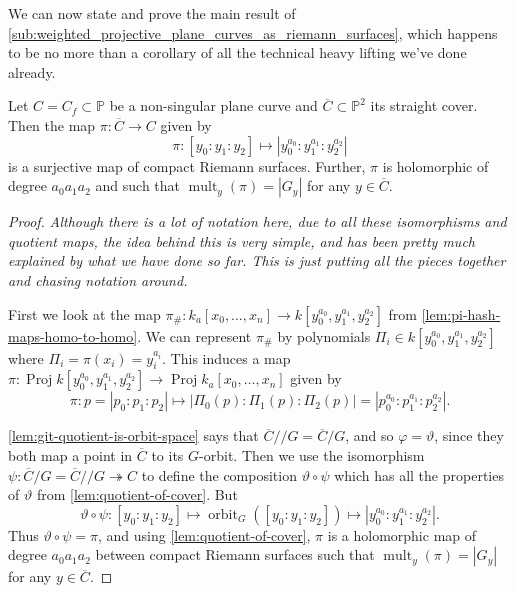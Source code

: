 \documentclass[10pt,notitlepage]{article}
\numberwithin{equation}{subsection}
\DeclareMathOperator{\proj}{Proj}
\DeclareMathOperator{\mult}{mult}
\DeclareMathOperator{\orbit}{orbit}
\newcommand{\pee}{\mathbb{P}}
\newcommand{\cover}[1]{\overline{#1}}
\newcommand{\kazn}{k_a[x_0,\ldots,x_n]}
\newcommand{\sslash}{/\!\!/}
\begin{document}
        We can now state and prove the main result of \cref{sub:weighted_projective_plane_curves_as_riemann_surfaces}, which happens to be no more than a corollary of all the technical heavy lifting we've done already.

        \begin{corollary}\label{cor:quotient-set-up-with-pi-etc}
            Let $C=C_f\subset\pee$ be a non-singular plane curve and $\cover{C}\subset\pee^2$ its straight cover.
            Then the map $\pi\colon\cover{C}\to C$ given by
            \[
                \pi\colon[y_0:y_1:y_2]\mapsto|y_0^{a_0}:y_1^{a_1}:y_2^{a_2}|
            \]
            is a surjective map of compact Riemann surfaces.
            Further, $\pi$ is holomorphic of degree $a_0a_1a_2$ and such that $\mult_y(\pi)=|G_y|$ for any $y\in\cover{C}$.
        \end{corollary}

        \begin{proof}
            \emph{Although there is a lot of notation here, due to all these isomorphisms and quotient maps, the idea behind this is very simple, and has been pretty much explained by what we have done so far.
                        This is just putting all the pieces together and chasing notation around.}

            First we look at the map $\pi_\#\colon\kazn\to k[y_0^{a_0},y_1^{a_1},y_2^{a_2}]$ from \cref{lem:pi-hash-maps-homo-to-homo}.
            We can represent $\pi_\#$ by polynomials $\Pi_i\in k[y_0^{a_0},y_1^{a_1},y_2^{a_2}]$ where $\Pi_i=\pi(x_i)=y_i^{a_i}$.
            This induces a map $\pi\colon\proj k[y_0^{a_0},y_1^{a_1},y_2^{a_2}]\to\proj\kazn$ given by
            \[
                \pi\colon p=|p_0:p_1:p_2|\mapsto|\Pi_0(p):\Pi_1(p):\Pi_2(p)| = |p_0^{a_0}:p_1^{a_1}:p_2^{a_2}|.
            \]

            \cref{lem:git-quotient-is-orbit-space} says that $\cover{C}\sslash G=\cover{C}/G$, and so $\varphi=\vartheta$, since they both map a point in $\cover{C}$ to its $G$-orbit.
            Then we use the isomorphism $\psi\colon\cover{C}/G=\cover{C}\sslash G\twoheadrightarrow C$ to define the composition $\vartheta\circ\psi$ which has all the properties of $\vartheta$ from \cref{lem:quotient-of-cover}.
            But
            \[
                \vartheta\circ\psi\colon [y_0:y_1:y_2]\mapsto\orbit_G([y_0:y_1:y_2])\mapsto|y_0^{a_0}:y_1^{a_1}:y_2^{a_2}|.
            \]
            Thus $\vartheta\circ\psi=\pi$, and using \cref{lem:quotient-of-cover}, $\pi$ is a holomorphic map of degree $a_0a_1a_2$ between compact Riemann surfaces such that $\mult_y(\pi)=|G_y|$ for any $y\in\cover{C}$.
        \end{proof}
\end{document}
